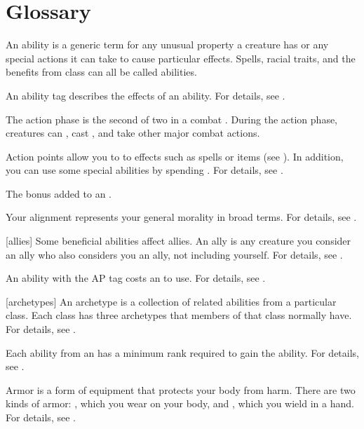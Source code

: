 \chapter{Glossary}\label{Glossary}

 An ability is a generic term for any unusual property a creature has or any special actions it can take to cause particular effects.
Spells, racial traits, and the benefits from class  can all be called abilities.

 An ability tag describes the effects of an ability.
For details, see .

 The action phase is the second of two  in a combat .
During the action phase, creatures can , cast , and take other major combat actions.

 Action points allow you to  to effects such as spells or items (see ).
In addition, you can use some special abilities by spending .
For details, see .

 The bonus added to an .

 Your alignment represents your general morality in broad terms.
For details, see .

[allies] Some beneficial abilities affect allies.
An ally is any creature you consider an ally who also considers you an ally, not including yourself.
For details, see .

 An ability with the AP tag costs an  to use.
For details, see .

[archetypes] An archetype is a collection of related abilities from a particular class.
Each class has three archetypes that members of that class normally have.
For details, see .

 Each ability from an  has a minimum rank required to gain the ability.
For details, see .

 Armor is a form of equipment that protects your body from harm.
There are two kinds of armor: , which you wear on your body, and , which you wield in a hand.
For details, see .

